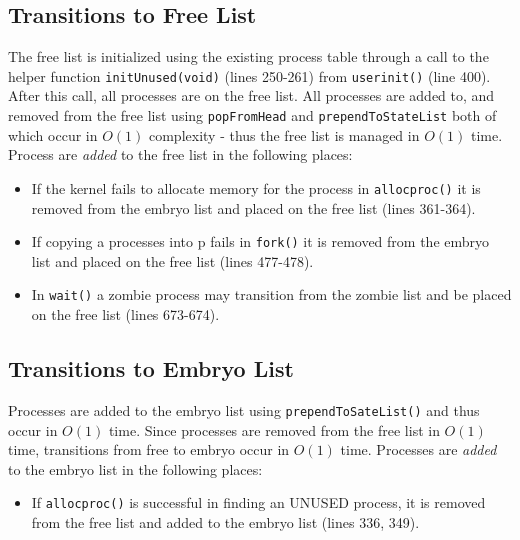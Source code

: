 \documentclass[11pt,letterpaper]{report}
\begin{document}
	\subsection*{Transitions to Free List}
	The free list is initialized using the existing process table through a call to the helper function {\tt initUnused(void)} (lines 250-261) from {\tt userinit()} (line 400).  After this call, all processes are on the free list. All processes are added to, and removed from the free list using {\tt popFromHead} and {\tt prependToStateList} both of which occur in $O(1)$ complexity - thus the free list is managed in $O(1)$ time. Process are \emph{added} to the 
	free list in the following places:
		\begin{itemize}
			\item If the kernel fails to allocate memory for the process in {\tt allocproc()} it is removed from the embryo list and placed on the free list (lines 361-364). 
			\item If copying a processes into p fails in {\tt fork()} it is removed from the embryo list and placed on the free list (lines 477-478). 
			\item In {\tt wait()} a zombie process may transition from the zombie list and be placed on the free list (lines 673-674).
		\end{itemize}
		
	\subsection*{Transitions to Embryo List}
	Processes are added to the embryo list using {\tt prependToSateList()} and thus occur in $O(1)$ time. Since processes are removed from the free list in $O(1)$ time, transitions from free to embryo occur in $O(1)$ time. 
	Processes are \emph{added} to the embryo list in the following places:
		\begin{itemize}
			\item If {\tt allocproc()} is successful in finding an UNUSED process, it is removed from the free list and added to the embryo list (lines 336, 349).
		\end{itemize}
	
\end{document}
